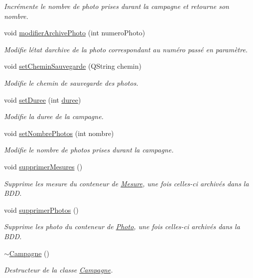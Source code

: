 \begin{DoxyCompactItemize}
\begin{DoxyCompactList}\small\item\em Incrémente le nombre de photo prises durant la campagne et retourne son nombre. \end{DoxyCompactList}\item 
void \hyperlink{class_campagne_a7751a5a0b5d1be46384f57b5409163e8}{modifier\+Archive\+Photo} (int numero\+Photo)
\begin{DoxyCompactList}\small\item\em Modifie l\textquotesingle{}état d\textquotesingle{}archive de la photo correspondant au numéro passé en paramètre. \end{DoxyCompactList}\item 
void \hyperlink{class_campagne_a68c7eb6776e46306b10f1ca2a409ae6e}{set\+Chemin\+Sauvegarde} (Q\+String chemin)
\begin{DoxyCompactList}\small\item\em Modifie le chemin de sauvegarde des photos. \end{DoxyCompactList}\item 
void \hyperlink{class_campagne_aff9aebbc64c40ce2c1b5ae584c7a8d71}{set\+Duree} (int \hyperlink{class_campagne_a4fb4cb286275103c9b6946e25e301fbf}{duree})
\begin{DoxyCompactList}\small\item\em Modifie la duree de la campagne. \end{DoxyCompactList}\item 
void \hyperlink{class_campagne_a2b8848ade0f97708571331ef71e4c9cb}{set\+Nombre\+Photos} (int nombre)
\begin{DoxyCompactList}\small\item\em Modifie le nombre de photos prises durant la campagne. \end{DoxyCompactList}\item 
void \hyperlink{class_campagne_a77066423e53f99bb6cd39fd25a6f2b5f}{supprimer\+Mesures} ()
\begin{DoxyCompactList}\small\item\em Supprime les mesure du conteneur de \hyperlink{struct_mesure}{Mesure}, une fois celles-\/ci archivés dans la B\+DD. \end{DoxyCompactList}\item 
void \hyperlink{class_campagne_ad2fc4d5863302c88ded7b58991b1398a}{supprimer\+Photos} ()
\begin{DoxyCompactList}\small\item\em Supprime les photo du conteneur de \hyperlink{struct_photo}{Photo}, une fois celles-\/ci archivés dans la B\+DD. \end{DoxyCompactList}\item 
\hyperlink{class_campagne_a250c1d51fba057efbd7d1f66dce7c6e9}{$\sim$\+Campagne} ()
\begin{DoxyCompactList}\small\item\em Destructeur de la classe \hyperlink{class_campagne}{Campagne}. \end{DoxyCompactList}\end{DoxyCompactItemize}
